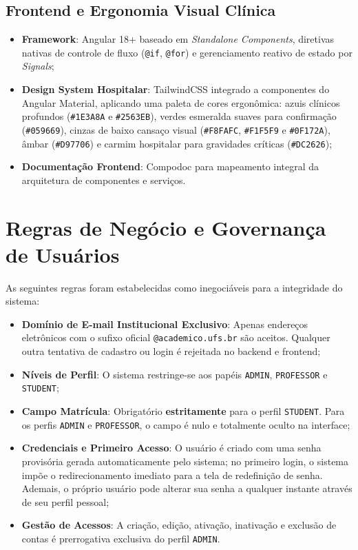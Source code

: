 \subsection{Frontend e Ergonomia Visual Clínica}
\begin{itemize}
    \item \textbf{Framework}: Angular 18+ baseado em \textit{Standalone Components}, diretivas nativas de controle de fluxo (\texttt{@if}, \texttt{@for}) e gerenciamento reativo de estado por \textit{Signals};
    \item \textbf{Design System Hospitalar}: TailwindCSS integrado a componentes do Angular Material, aplicando uma paleta de cores ergonômica: azuis clínicos profundos (\texttt{\#1E3A8A} e \texttt{\#2563EB}), verdes esmeralda suaves para confirmação (\texttt{\#059669}), cinzas de baixo cansaço visual (\texttt{\#F8FAFC}, \texttt{\#F1F5F9} e \texttt{\#0F172A}), âmbar (\texttt{\#D97706}) e carmim hospitalar para gravidades críticas (\texttt{\#DC2626});
    \item \textbf{Documentação Frontend}: Compodoc para mapeamento integral da arquitetura de componentes e serviços.
\end{itemize}

\section{Regras de Negócio e Governança de Usuários}
\label{sec:regras-negocio}

As seguintes regras foram estabelecidas como inegociáveis para a integridade do sistema:
\begin{itemize}
    \item \textbf{Domínio de E-mail Institucional Exclusivo}: Apenas endereços eletrônicos com o sufixo oficial \texttt{@academico.ufs.br} são aceitos. Qualquer outra tentativa de cadastro ou login é rejeitada no backend e frontend;
    \item \textbf{Níveis de Perfil}: O sistema restringe-se aos papéis \texttt{ADMIN}, \texttt{PROFESSOR} e \texttt{STUDENT};
    \item \textbf{Campo Matrícula}: Obrigatório \textbf{estritamente} para o perfil \texttt{STUDENT}. Para os perfis \texttt{ADMIN} e \texttt{PROFESSOR}, o campo é nulo e totalmente oculto na interface;
    \item \textbf{Credenciais e Primeiro Acesso}: O usuário é criado com uma senha provisória gerada automaticamente pelo sistema; no primeiro login, o sistema impõe o redirecionamento imediato para a tela de redefinição de senha. Ademais, o próprio usuário pode alterar sua senha a qualquer instante através de seu perfil pessoal;
    \item \textbf{Gestão de Acessos}: A criação, edição, ativação, inativação e exclusão de contas é prerrogativa exclusiva do perfil \texttt{ADMIN}.
\end{itemize}

